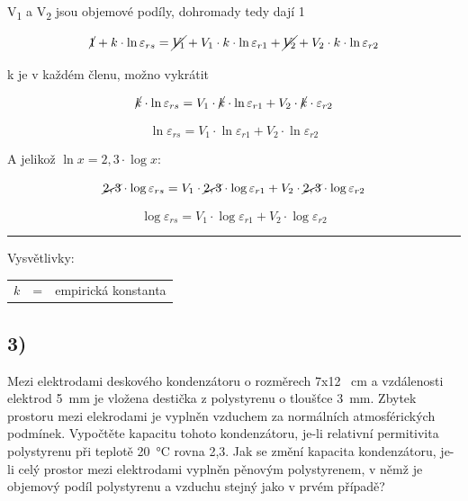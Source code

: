 V\textsubscript{1} a V\textsubscript{2} jsou objemové podíly, dohromady tedy dají 1

\begin{equation*}
    \cancel{1} + k \cdot \ln \varepsilon_{rs} = \cancel{V_1} + V_1 \cdot k \cdot \ln \varepsilon_{r1} + \cancel{V_2} + V_2 \cdot k \cdot \ln \varepsilon_{r2}
\end{equation*}

k je v každém členu, možno vykrátit

\begin{equation*}
    \cancel{k} \cdot \ln \varepsilon_{rs} = V_1 \cdot \cancel{k} \cdot \ln \varepsilon_{r1} + V_2 \cdot \cancel{k} \cdot \varepsilon_{r2}
\end{equation*}

\begin{equation*}
    \ln \varepsilon_{rs} = V_1 \cdot \ln \varepsilon_{r1} + V_2 \cdot \ln \varepsilon_{r2}
\end{equation*}

A jelikož $\ln x = 2,3 \cdot \log x$:

\begin{equation*}
    \cancel{2,3} \cdot \log \varepsilon_{rs} = V_1 \cdot \cancel{2,3} \cdot \log \varepsilon_{r1} + V_2 \cdot \cancel{2,3} \cdot \log \varepsilon_{r2}
\end{equation*}

\begin{equation*}
    \log \varepsilon_{rs} = V_1 \cdot \log \varepsilon_{r1} + V_2 \cdot \log \varepsilon_{r2}
\end{equation*}

\noindent\rule{8cm}{0.4pt}

Vysvětlivky:

\begin{tabular}{rcl}
    $k$ & = & empirická konstanta \\
\end{tabular}

\newpage


\subsection*{3)}
Mezi elektrodami deskového kondenzátoru o rozměrech 7x12 \SI{}{\centi\meter} a vzdálenosti elektrod \SI{5}{\milli\meter} je vložena destička z polystyrenu o tloušťce \SI{3}{\milli\meter}. Zbytek prostoru mezi elekrodami je vyplněn vzduchem za normálních atmosférických podmínek. Vypočtěte kapacitu tohoto kondenzátoru, je-li relativní permitivita polystyrenu při teplotě \SI{20}{\degreeCelsius} rovna 2,3. Jak se změní kapacita kondenzátoru, je-li celý prostor mezi elektrodami vyplněn pěnovým polystyrenem, v němž je objemový podíl polystyrenu a vzduchu stejný jako v prvém případě?

